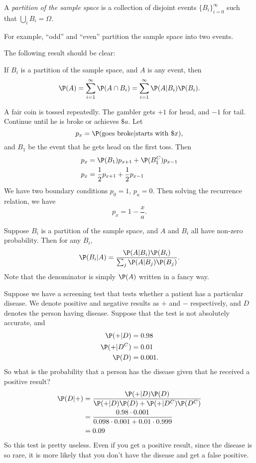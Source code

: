 \documentclass[a4paper]{article}
\begin{document}
\begin{defi}[Partition]
  A \emph{partition of the sample space} is a collection of disjoint events $\{B_i\}_{i = 0}^\infty$ such that $\bigcup_i B_i = \Omega$.
\end{defi}
For example, ``odd'' and ``even'' partition the sample space into two events.

The following result should be clear:
\begin{prop}
  If $B_i$ is a partition of the sample space, and $A$ is any event, then
  \[
    \P(A) = \sum_{i = 1}^\infty \P(A\cap B_i) = \sum_{i = 1}^\infty \P(A|B_i) \P(B_i).
  \]
\end{prop}

\begin{eg}
  A fair coin is tossed repeatedly. The gambler gets $+1$ for head, and $-1$ for tail. Continue until he is broke or achieves $\$a$. Let
  \[
    p_x = \P(\text{goes broke}|\text{starts with \$}x),
  \]
  and $B_1$ be the event that he gets head on the first toss. Then
  \begin{align*}
    p_x &= \P(B_1)p_{x + 1} + \P(B_1^C) p_{x - 1}\\
    p_x &= \frac{1}{2}p_{x + 1} + \frac{1}{2}p_{x - 1}
  \end{align*}
  We have two boundary conditions $p_0 = 1$, $p_a = 0$. Then solving the recurrence relation, we have
  \[
    p_x = 1 - \frac{x}{a}.
  \]
\end{eg}

\begin{thm}
  Suppose $B_i$ is a partition of the sample space, and $A$ and $B_i$ all have non-zero probability. Then for any $B_i$,
  \[
    \P(B_i | A) = \frac{\P(A | B_i)\P(B_i)}{\sum_j\P(A | B_j)\P(B_j)}.
  \]
  Note that the denominator is simply $\P(A)$ written in a fancy way.
\end{thm}

\begin{eg}
  Suppose we have a screening test that tests whether a patient has a particular disease. We denote positive and negative results as $+$ and $-$ respectively, and $D$ denotes the person having disease. Suppose that the test is not absolutely accurate, and
  \begin{align*}
    \P(+ | D) &= 0.98\\
    \P(+ | D^C) &= 0.01\\
    \P(D) &= 0.001.
  \end{align*}
  So what is the probability that a person has the disease given that he received a positive result?
  \begin{align*}
    \P(D|+) &= \frac{\P(+ | D)\P(D)}{\P(+|D)\P(D) + \P(+|D^C)\P(D^C)}\\
    &= \frac{0.98\cdot 0.001}{0.098\cdot 0.001 + 0.01\cdot 0.999}\\
    &=  0.09
  \end{align*}
  So this test is pretty useless. Even if you get a positive result, since the disease is so rare, it is more likely that you don't have the disease and get a false positive.
\end{eg}
\end{document}
